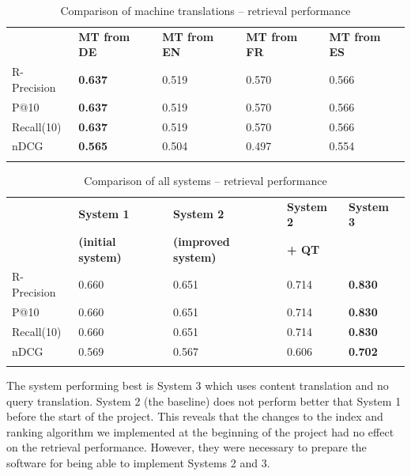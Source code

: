 \documentclass[a4paper,11pt]{article}
\begin{document}
\begin{table}[ht]
\centering
\begin{tabularx}{\textwidth}{lllll}
\toprule
\addlinespace
& \textbf{MT from DE} & \textbf{MT from EN} & \textbf{MT from FR} & \textbf{MT from ES} \\
\addlinespace
\cmidrule{1-5}
\addlinespace
R-Precision &  \textbf{0.637} & 0.519 & 0.570 & 0.566 \\
\addlinespace
P@10 & \textbf{0.637} & 0.519 & 0.570 & 0.566 \\
\addlinespace
Recall(10) & \textbf{0.637} & 0.519 & 0.570 & 0.566 \\
\addlinespace
nDCG & \textbf{0.565} & 0.504 & 0.497 & 0.554 \\
\addlinespace
\bottomrule
\end{tabularx}
\caption{Comparison of machine translations -- retrieval performance}
\label{tab:performance_mt_systems}
\end{table}

\begin{table}[ht]
\centering
\begin{tabularx}{\textwidth}{lllll}
\toprule
\addlinespace
& \textbf{System 1} & \textbf{System 2} & \textbf{System 2} & \textbf{System 3} \\
& \textbf{(initial system)} & \textbf{(improved system)} & \textbf{+ QT} & \\
\addlinespace
\cmidrule{1-5}
\addlinespace
R-Precision &  0.660 & 0.651 & 0.714 & \textbf{0.830} \\
\addlinespace
P@10 & 0.660 & 0.651 & 0.714 & \textbf{0.830} \\
\addlinespace
Recall(10) & 0.660 & 0.651 & 0.714 & \textbf{0.830} \\
\addlinespace
nDCG & 0.569 & 0.567 & 0.606 & \textbf{0.702} \\
\addlinespace
\bottomrule
\end{tabularx}
\caption{Comparison of all systems -- retrieval performance}
\label{tab:performance_all_systems}
\end{table}

The system performing best is System 3 which uses content translation and no query translation. System 2 (the baseline) does not perform better that System 1 before the start of the project. This reveals that the changes to the index and ranking algorithm we implemented at the beginning of the project had no effect on the retrieval performance. However, they were necessary to prepare the software for being able to implement Systems 2 and 3. 
\end{document}
